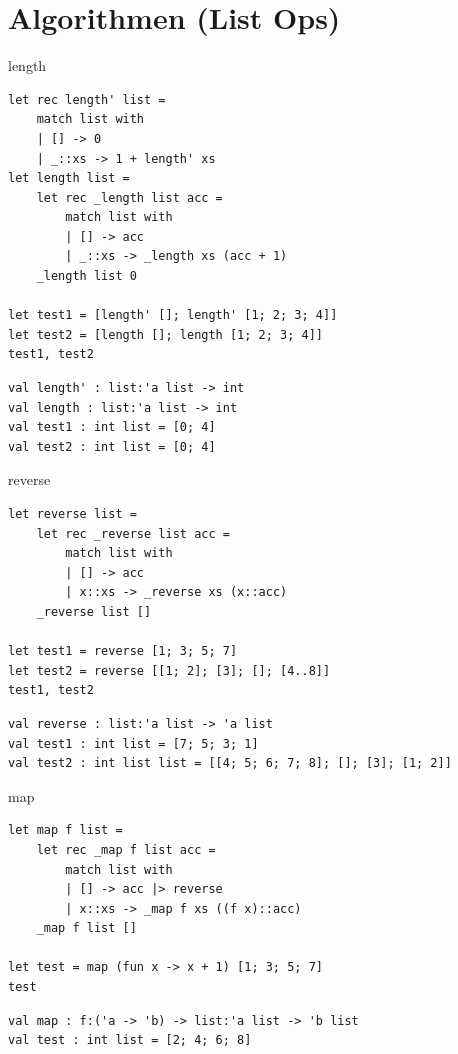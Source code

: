 \documentclass[t]{beamer}
\begin{document}
\section{Algorithmen (List Ops) }
\label{sec:org2cccefd}
\begin{frame}[label={sec:orgb07d0f9},fragile]{length}
 \begin{verbatim}
let rec length' list =
    match list with
    | [] -> 0
    | _::xs -> 1 + length' xs
let length list =
    let rec _length list acc =
        match list with
        | [] -> acc
        | _::xs -> _length xs (acc + 1)
    _length list 0

let test1 = [length' []; length' [1; 2; 3; 4]]
let test2 = [length []; length [1; 2; 3; 4]]
test1, test2
\end{verbatim}

\begin{verbatim}
val length' : list:'a list -> int
val length : list:'a list -> int
val test1 : int list = [0; 4]
val test2 : int list = [0; 4]
\end{verbatim}
\end{frame}

\begin{frame}[label={sec:orgfa6ab8e},fragile]{reverse}
 \begin{verbatim}
let reverse list =
    let rec _reverse list acc =
        match list with
        | [] -> acc
        | x::xs -> _reverse xs (x::acc)
    _reverse list []

let test1 = reverse [1; 3; 5; 7]
let test2 = reverse [[1; 2]; [3]; []; [4..8]]
test1, test2
\end{verbatim}

\begin{verbatim}
val reverse : list:'a list -> 'a list
val test1 : int list = [7; 5; 3; 1]
val test2 : int list list = [[4; 5; 6; 7; 8]; []; [3]; [1; 2]]
\end{verbatim}
\end{frame}

\begin{frame}[label={sec:org6c7e644},fragile]{map}
 \begin{verbatim}
let map f list = 
    let rec _map f list acc =
        match list with
        | [] -> acc |> reverse
        | x::xs -> _map f xs ((f x)::acc)
    _map f list []   

let test = map (fun x -> x + 1) [1; 3; 5; 7]
test
\end{verbatim}

\begin{verbatim}
val map : f:('a -> 'b) -> list:'a list -> 'b list
val test : int list = [2; 4; 6; 8]
\end{verbatim}
\end{frame}
\end{document}
